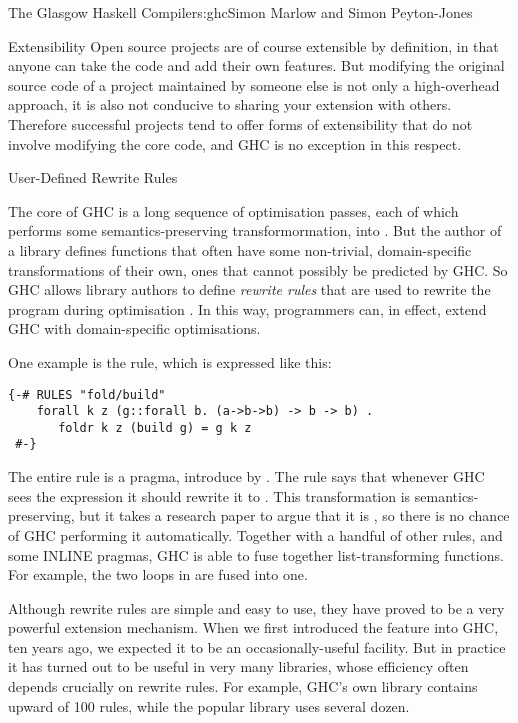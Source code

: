 \begin{aosachapter}{The Glasgow Haskell Compiler}{s:ghc}{Simon Marlow and Simon Peyton-Jones}
\begin{aosasect1}{Extensibility}
Open source projects are of course extensible by definition, in that
anyone can take the code and add their own features.  But modifying
the original source code of a project maintained by someone else is
not only a high-overhead approach, it is also not conducive to sharing
your extension with others.  Therefore successful projects tend to
offer forms of extensibility that do not involve modifying the core
code, and GHC is no exception in this respect.

\begin{aosasect2}{User-Defined Rewrite Rules}
\label{s:rules}

The core of GHC is a long sequence of optimisation passes, each of
which performs some semantics-preserving transformormation, 
into .  But the author of a library defines functions that
often have some non-trivial, domain-specific transformations of their
own, ones that cannot possibly be predicted by GHC. So GHC allows
library authors to define \emph{rewrite rules} that are used to
rewrite the program during optimisation
\cite{bib:playing-by-the-rules}.  In this way, programmers can,
in effect, extend GHC with domain-specific optimisations.

One example is the  rule, which is expressed like this:
\begin{verbatim}
{-# RULES "fold/build"    
    forall k z (g::forall b. (a->b->b) -> b -> b) . 
       foldr k z (build g) = g k z
 #-}
\end{verbatim}

The entire rule is a pragma, introduce by .  The rule
  says that whenever GHC sees the expression  it should rewrite it to .  This transformation
  is semantics-preserving, but it takes a research paper to argue that
  it is \cite{bib:gill-short-cut}, so there is no chance of GHC performing
  it automatically.  Together with a handful of other rules, and some
  INLINE pragmas, GHC is able to fuse together list-transforming
  functions.  For example, the two loops in 
  are fused into one.

Although rewrite rules are simple and easy to use, they have proved to
be a very powerful extension mechanism.  When we first introduced the
feature into GHC, ten years ago, we expected it to be an
occasionally-useful facility.  But in practice it has turned out to be
useful in very many libraries, whose efficiency often depends
crucially on rewrite rules.  For example, GHC's own 
library contains upward of 100 rules, while the popular 
library uses several dozen.


\end{aosasect2}
\end{aosasect1}
\end{aosachapter}
